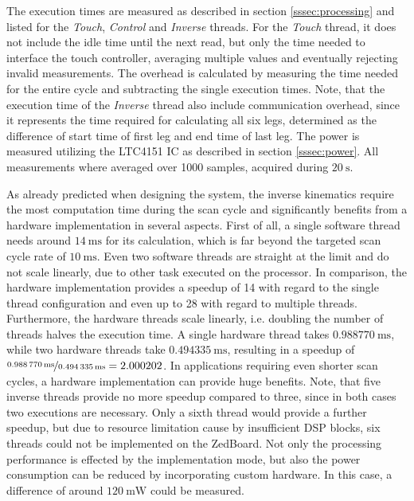 The execution times are measured as described in section
\ref{sssec:processing} and listed for the \emph{Touch}, \emph{Control} and
\emph{Inverse} threads. For the \emph{Touch} thread, it does not include the
idle time until the next read, but only the time needed to interface the touch
controller, averaging multiple values and eventually rejecting invalid
measurements. The overhead is calculated by measuring the time needed for the
entire cycle and subtracting the single execution times. Note, that the
execution time of the \emph{Inverse} thread also include communication
overhead, since it represents the time required for calculating all six legs,
determined as the difference of start time of first leg and end time of last
leg. The power is measured utilizing the LTC4151 \ac{IC} as described in
section \ref{sssec:power}. All measurements where averaged over 1000 samples,
acquired during $\SI{20}{\second}$.

As already predicted when designing the system, the inverse kinematics require
the most computation time during the scan cycle and significantly benefits
from a hardware implementation in several aspects. First of all, a single
software thread needs around $\SI{14}{\milli\second}$ for its calculation,
which is far beyond the targeted scan cycle rate of $\SI{10}{\milli\second}$.
Even two software threads are straight at the limit and do not scale linearly,
due to other task executed on the processor. In comparison, the hardware
implementation provides a speedup of 14 with regard to the single thread
configuration and even up to 28 with regard to multiple threads. Furthermore,
the hardware threads scale linearly, i.e. doubling the number of threads
halves the execution time. A single hardware thread takes
$\SI{0.988770}{\milli\second}$, while two hardware threads take
$\SI{0.494335}{\milli\second}$, resulting in a speedup of $\nicefrac{\SI{0.988
770}{\milli\second}}{\SI{0.494335}{\milli\second}}=2.000202$. In applications
requiring even shorter scan cycles, a hardware implementation can provide huge
benefits. Note, that five inverse threads provide no more speedup compared to
three, since in both cases two executions are necessary. Only a sixth thread
would provide a further speedup, but due to resource limitation cause by
insufficient \ac{DSP} blocks, six threads could not be implemented on the
ZedBoard. Not only the processing performance is effected by the
implementation mode, but also the power consumption can be reduced by
incorporating custom hardware. In this case, a difference of around
$\SI{120}{\milli\watt}$ could be measured.

